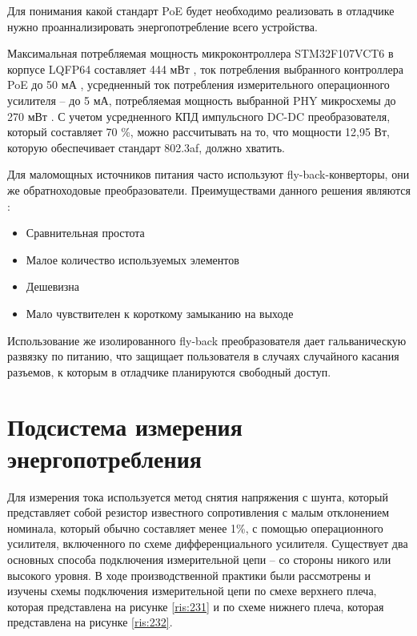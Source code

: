 Для понимания какой стандарт PoE будет необходимо реализовать в отладчике
нужно проаннализировать энергопотребление всего устройства.

Максимальная потребляемая мощность микроконтроллера STM32F107VCT6 в корпусе LQFP64 составляет 
444 мВт \cite{STM32:datasheet}, ток потребления выбранного контроллера PoE до 50 мА 
\cite{TPS2376:datasheet}, усредненный ток потребления измерительного операционного усилителя --
до 5 мА, потребляемая мощность выбранной PHY микросхемы до 270 мВт \cite{DP83848:datasheet}.
С учетом усредненного КПД импульсного DC-DC преобразователя, который составляет 70 \%, можно
рассчитывать на то, что мощности 12,95 Вт, которую обеспечивает стандарт 802.3af, должно хватить.

Для маломощных источников питания часто используют fly-back-конверторы, они же обратноходовые
преобразователи. Преимуществами данного решения являются \cite{PowerElectronic:FlyBack}:
\begin{itemize}
  \item Сравнительная простота
  \item Малое количество используемых элементов
  \item Дешевизна
  \item Мало чувствителен к короткому замыканию на выходе
\end{itemize}

Использование же изолированного fly-back преобразователя дает гальваническую развязку по питанию,
что защищает пользователя в случаях случайного касания разъемов, к которым в отладчике 
планируются свободный доступ.

\section{Подсистема измерения энергопотребления}
\hspace{1cm} 

Для измерения тока используется метод снятия напряжения с шунта,
 который представляет собой резистор известного сопротивления с малым отклонением номинала,
 который обычно составляет менее 1\%, с помощью операционного
усилителя, включенного по схеме дифференциального усилителя.
Существует два основных способа подключения измерительной цепи – со стороны никого
или высокого уровня. В ходе производственной практики были рассмотрены и изучены схемы
подключения измерительной цепи по смехе верхнего плеча, которая представлена на рисунке
\ref{ris:231} и по схеме нижнего плеча, которая представлена на рисунке \ref{ris:232}.


